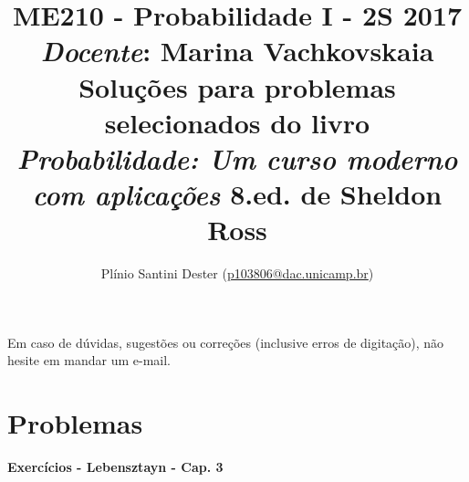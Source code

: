 


\title{	ME210 - Probabilidade I - 2S 2017\\
		{\large \textit{Docente}: Marina Vachkovskaia}\\[2mm]
		{\large Soluções para problemas selecionados do livro\\[-2mm]
        \textit{Probabilidade: Um curso moderno com aplicações}
        8.ed. de Sheldon Ross}\\
}
\author{Plínio Santini Dester (\url{p103806@dac.unicamp.br})}



\maketitle

Em caso de dúvidas, sugestões ou correções (inclusive erros de digitação), não hesite em mandar um e-mail.

\setcounter{section}{3}
\section{Problemas}

\newpage

\vspace{3mm} {\Large \textbf{Exercícios - Lebensztayn - Cap. 3}}
\renewcommand{\thequestion}{\arabic{question}}



